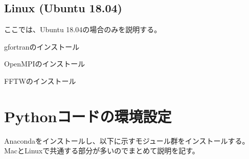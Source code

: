 \documentclass[letterpaper,10pt,dvipdfmx,report]{sphinxmanual}
\begin{document}
\subsection{Linux (Ubuntu 18.04)}
\label{\detokenize{environment:linux-ubuntu-18-04}}
ここでは、Ubuntu 18.04の場合のみを説明する。

gfortranのインストール

\begin{sphinxVerbatim}[commandchars=\\\{\}]
   
\end{sphinxVerbatim}

OpenMPIのインストール

\begin{sphinxVerbatim}[commandchars=\\\{\}]
     
\end{sphinxVerbatim}

FFTWのインストール

\begin{sphinxVerbatim}[commandchars=\\\{\}]
   
\end{sphinxVerbatim}


\section{Pythonコードの環境設定}
\label{\detokenize{environment:python}}
Anacondaをインストールし、以下に示すモジュール群をインストールする。
MacとLinuxで共通する部分が多いのでまとめて説明を記す。
\end{document}
